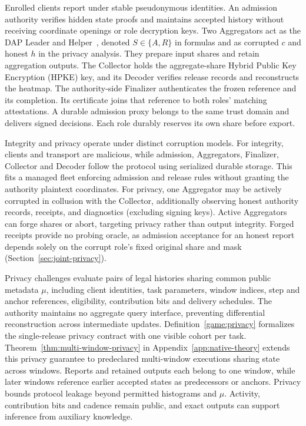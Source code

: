 \documentclass[conference,compsoc]{IEEEtran}
\theoremstyle{definition}
\numberwithin{equation}{section}
\numberwithin{table}{section}
\numberwithin{figure}{section}
\theoremstyle{plain}
\begin{document}
Enrolled clients report under stable pseudonymous identities. An admission
authority verifies hidden state proofs and maintains accepted history without
receiving coordinate openings or role decryption keys. Two Aggregators act
as the DAP Leader and Helper~\cite{Geoghegan2026DAP}, denoted \(S\in\{A,R\}\)
in formulas and as corrupted \(c\) and honest \(h\) in the privacy analysis. They
prepare input shares and retain aggregation outputs. The Collector holds the aggregate-share
Hybrid Public Key Encryption (HPKE) key, and its Decoder verifies release records and reconstructs the heatmap. The
authority-side Finalizer authenticates the frozen reference and its completion.
Its certificate joins that reference to both roles' matching attestations. A durable admission proxy
belongs to the same trust domain and delivers signed decisions. Each role
durably reserves its own share before export.

Integrity and privacy operate under distinct corruption models. For integrity, clients and transport are malicious, while admission, Aggregators, Finalizer, Collector and Decoder follow the protocol using serialized durable storage. This fits a managed fleet enforcing admission and release rules without granting the authority plaintext coordinates.
For privacy, one Aggregator may be actively corrupted in collusion with the Collector, additionally observing honest authority records, receipts, and diagnostics (excluding signing keys). Active Aggregators can forge shares or abort, targeting privacy rather than output integrity. Forged receipts provide no probing oracle, as admission acceptance for an honest report depends solely on the corrupt role's fixed original share and mask (Section~\ref{sec:joint-privacy}).

Privacy challenges evaluate pairs of legal histories sharing common public metadata \(\mu\), including client identities, task parameters, window indices, step and anchor references, eligibility, contribution bits and delivery schedules. The authority maintains no aggregate query interface, preventing differential reconstruction across intermediate updates. Definition~\ref{game:privacy} formalizes the single-release privacy contract with one visible cohort per task. Theorem~\ref{thm:multi-window-privacy} in Appendix~\ref{app:native-theory} extends this privacy guarantee to predeclared multi-window executions sharing state across windows. Reports and retained outputs each belong to one window, while later windows reference earlier accepted states as predecessors or anchors. Privacy bounds protocol leakage beyond permitted histograms and \(\mu\). Activity, contribution bits and cadence remain public, and exact outputs can support inference from auxiliary knowledge.
\end{document}
